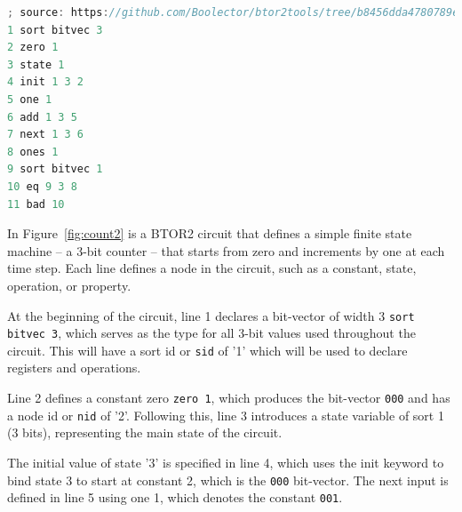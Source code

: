 
\lstset{style=mystyle}
\begin{lstlisting}[language=Verilog, caption=BTOR2 example]
; source: https://github.com/Boolector/btor2tools/tree/b8456dda4780789e882f5791eb486f295ade4da4/examples/btorsim
1 sort bitvec 3
2 zero 1
3 state 1
4 init 1 3 2
5 one 1
6 add 1 3 5
7 next 1 3 6
8 ones 1
9 sort bitvec 1
10 eq 9 3 8
11 bad 10
\end{lstlisting}


In Figure~\ref{fig:count2} is a BTOR2 circuit that defines a simple finite state machine -- a 3-bit counter -- that starts from zero and increments by one at each time step. Each line defines a node in the circuit, such as a constant, state, operation, or property.



At the beginning of the circuit, line 1 declares a bit-vector of width 3 \verb|sort bitvec 3|, which serves as the type for all 3-bit values used throughout the circuit. This will have a sort id or \verb|sid| of '1' which will be used to declare registers and operations.

Line 2 defines a constant zero \verb|zero 1|, which produces the bit-vector \verb|000| and has a node id or \verb|nid| of '2'. Following this, line 3 introduces a state variable of sort 1 (3 bits), representing the main state of the circuit.

The initial value of state '3' is specified in line 4, which uses the init keyword to bind state 3 to start at constant 2, which is the \verb|000| bit-vector. The next input is defined in line 5 using one 1, which denotes the constant \verb|001|.

